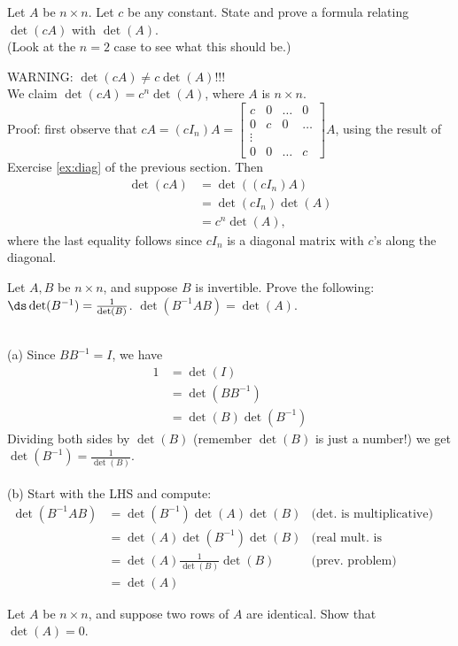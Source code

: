 \bb
\ii Let $A$ be $n\times n$. Let $c$ be any constant. State and prove a formula relating $\det(cA)$ with $\det(A)$. 
\\
(Look at the $n=2$ case to see what this should be.) 
\\
\begin{solution}
\noindent
WARNING: $\det(cA)\ne c\det(A)$!!!
\\
We claim $\det(cA)=c^n\det(A)$, where $A$ is $n\times n$. 
\\
Proof: first observe that $cA=(cI_n)A=\begin{bmatrix}
c&0&\dots&0\\
0&c&0&\dots\\
\vdots &\\
0&0&\dots&c
\end{bmatrix}A$, using the result of Exercise \ref{ex:diag} of the previous section. Then 
\begin{align*}
\det(cA)&=\det((cI_n)A)\\
&=\det(cI_n)\det(A)\\
&=c^n\det(A),
\end{align*}
where the last equality follows since $cI_n$ is a diagonal matrix with $c$'s along the diagonal. 
\end{solution}
\ii Let $A,B$ be $n\times n$, and suppose $B$ is invertible. Prove the following:
\bb
\ii $\ds \det(B^{-1})=\frac{1}{\det(B)}$. 
\ii $\det(B^{-1}AB)=\det(A)$.
\ee
\begin{solution}
\ \\
(a) Since $BB^{-1}=I$, we have
\begin{align*}
1&=\det(I)\\
&=\det(BB^{-1})\\
&=\det(B)\det(B^{-1})
\end{align*}
Dividing both sides by $\det(B)$ (remember $\det(B)$ is just a number!) we get $\det(B^{-1})=\frac{1}{\det(B)}$. 
\\ \\
(b) Start with the LHS and compute:
\begin{align*}
\det(B^{-1}AB)&=\det(B^{-1})\det(A)\det(B) &\text{(det. is multiplicative)}\\
&=\det(A)\det(B^{-1})\det(B) &\text{(real mult. is commutative)}\\
&=\det(A)\frac{1}{\det(B)}\det(B) &\text{(prev. problem)}\\
&=\det(A)
\end{align*}
\end{solution}
\ii Let $A$ be $n\times n$, and suppose two rows of $A$ are identical. Show that $\det(A)=0$. 
